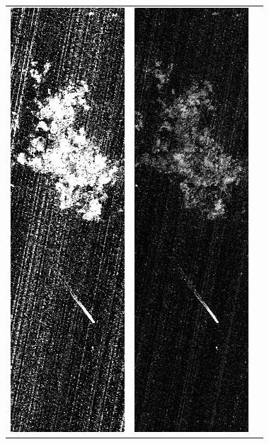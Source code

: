 \documentclass[12pt]{article}
\begin{document}
\begin{figure}
\begin{center}
\begin{tabular}{c c c}
\includegraphics[width=0.28\linewidth]{likelihood_image.png} &
\includegraphics[width=0.28\linewidth]{likelihood_naivebayes_image.png} &

\end{tabular}
\end{center}
\end{figure}
\end{document}
